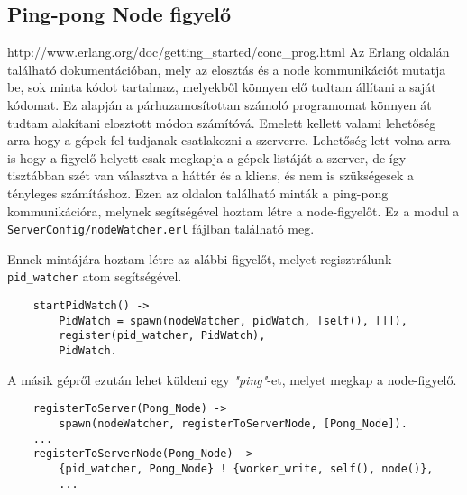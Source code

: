 \subsection{Ping-pong Node figyelő}
	http://www.erlang.org/doc/getting\_started/conc\_prog.html
	Az Erlang oldalán található dokumentációban, mely az elosztás és a node kommunikációt mutatja be, sok minta kódot tartalmaz, melyekből könnyen elő tudtam állítani a saját kódomat.\newline
	Ez alapján a párhuzamosítottan számoló programomat könnyen át tudtam alakítani elosztott módon számítóvá. \newline 
	Emelett kellett valami lehetőség arra hogy a gépek fel tudjanak csatlakozni a szerverre. Lehetőség lett volna arra is hogy a figyelő helyett csak megkapja a gépek listáját a szerver, de így tisztábban szét van választva a háttér és a kliens, és nem is szükségesek a tényleges számításhoz. \newline
	Ezen az oldalon található minták a ping-pong kommunikációra, melynek segítségével hoztam létre a node-figyelőt. Ez a modul a \texttt{ServerConfig/nodeWatcher.erl} fájlban található meg. \newline

	Ennek mintájára hoztam létre az alábbi figyelőt, melyet regisztrálunk \texttt{pid\_watcher} atom segítségével. 
	\begin{verbatim}
	startPidWatch() ->
	    PidWatch = spawn(nodeWatcher, pidWatch, [self(), []]),
	    register(pid_watcher, PidWatch),
	    PidWatch.
	\end{verbatim}

	A másik gépről ezután lehet küldeni egy \textit{"ping"}-et, melyet megkap a node-figyelő.
	\begin{verbatim}
	registerToServer(Pong_Node) ->
	    spawn(nodeWatcher, registerToServerNode, [Pong_Node]).
	...
	registerToServerNode(Pong_Node) -> 
	    {pid_watcher, Pong_Node} ! {worker_write, self(), node()},
	    ...
	\end{verbatim}



